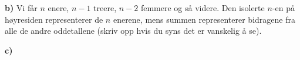 \textbf{b)} Vi får $ n $ enere, $ {n-1} $ treere, $ {n-2} $ femmere og så videre. Den isolerte $ n $-en på høyresiden representerer de $ n $ enerene, mens summen
representerer bidragene fra alle de andre oddetallene (skriv opp hvis du syns det er vanskelig å se). 

\textbf{c)} \vs
{}


